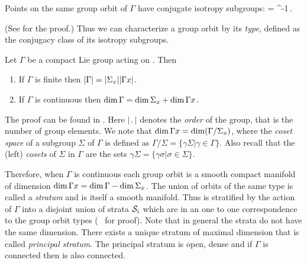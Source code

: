 
\addtocounter{definition}{1}

\begin{lemma}
\label{lem:stabGorbit}
Points on the same group orbit of $\Gamma$ have conjugate isotropy subgroups:
\beq
	=\gamma {} \gamma^{-1}\,.
\eeq
\end{lemma}
(See  for the proof.)
%
Thus we can characterize a group orbit by its \emph{type}, defined
as the conjugacy class of its isotropy subgroups.

\begin{proposition}
 \label{pro:dimOrb}
 Let $\Gamma$ be a compact Lie group acting on . Then
 \begin{enumerate}
  \item If $\Gamma$ is finite then $|\Gamma|=|\Sigma_{x}||\Gamma x|$.
  \item If $\Gamma$ is continuous then $\dim \Gamma = \dim \Sigma_{x}+\dim \Gamma x$.
 \end{enumerate}
\end{proposition}
The proof can be found in . Here $|\, .\, |$ denotes
the \emph{order} of the group, that is the number of group elements.
We note that
$\dim\Gamma x =\dim(\Gamma/\Sigma_{x})$, where the \emph{coset space} of
a subgroup $\Sigma$  of $\Gamma$ is defined as
$\Gamma/\Sigma=\{\gamma\Sigma|\gamma\in\Gamma\}$.
Also recall that the (left) \emph{cosets} of $\Sigma$ in $\Gamma$ are the sets
$\gamma\Sigma=\{\gamma\sigma|\sigma\in\Sigma\}$.


Therefore, when $\Gamma$ is continuous each group orbit is a smooth compact manifold of dimension
$\dim \Gamma x=\dim \Gamma-\dim \Sigma_{x}$. The union of orbits of the same type is called a \emph{stratum}
and is itself a smooth manifold. Thus  is stratified by the action of $\Gamma$ into
a disjoint union of strata $\mathcal{S}_{i}$ which are in an one to one correspondence to the group orbit types (\cf~ for proof).
Note that in general the strata do not have the same dimension. There exists a unique stratum  of maximal
dimension that is called \emph{principal stratum}. The principal stratum is open, dense
and if $\Gamma$ is connected then  is also connected.

